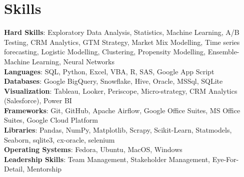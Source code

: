\section{Skills}
  \begin{itemize}[leftmargin=0.1in, label={}]
    \normalsize{\item{
      \textbf{Hard Skills}: Exploratory Data Analysis, Statistics, Machine Learning, A/B Testing, CRM Analytics, GTM Strategy, Market Mix Modelling, Time series forecasting, Logistic Modelling, Clustering, Propensity Modelling, Ensemble-Machine Learning, Neural Networks \\
      \textbf{Languages}: SQL, Python, Excel, VBA, R, SAS, Google App Script\\
      \textbf{Databases}: Google BigQuery, Snowflake, Hive, Oracle, MSSql, SQLite \\
      \textbf{Visualization}: Tableau, Looker, Periscope, Micro-strategy, CRM Analytics (Salesforce), Power BI \\
      \textbf{Frameworks}: Git, GitHub, Apache Airflow, Google Office Suites, MS Office Suites, Google Cloud Platform \\
      \textbf{Libraries}: Pandas, NumPy, Matplotlib, Scrapy, Scikit-Learn, Statmodels, Seaborn, sqlite3, cx-oracle, selenium \\
      \textbf{Operating Systems}: Fedora, Ubuntu, MacOS, Windows \\
      \textbf{Leadership Skills}: Team Management, Stakeholder Management, Eye-For-Detail, Mentorship \\
     }}
  \end{itemize}
